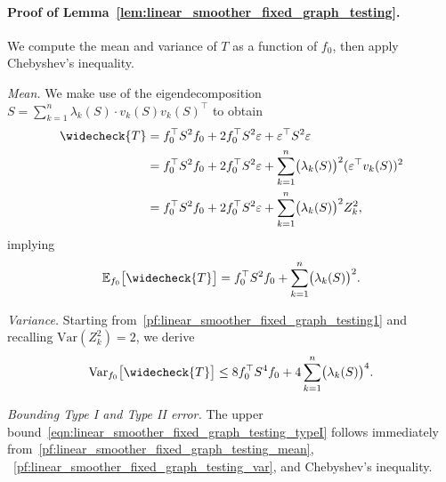 \documentclass[twoside]{article}
\newcommand{\Var}{\mathrm{Var}}
\newcommand{\1}{\mathbf{1}}
\newcommand{\Ebb}{\mathbb{E}}
\newcommand{\wc}[1]{\widecheck{#1}}
\theoremstyle{definition}
\theoremstyle{remark}
\begin{document}
\paragraph{Proof of Lemma~\ref{lem:linear_smoother_fixed_graph_testing}.}
We compute the mean and variance of $T$ as a function of $f_0$, then apply Chebyshev's inequality.

\textit{Mean.} We make use of the eigendecomposition $S = \sum_{k = 1}^{n} \lambda_k(S) \cdot v_k(S) v_k(S)^{\top}$ to obtain
\begin{equation}
\label{pf:linear_smoother_fixed_graph_testing1}
\begin{aligned}
\wc{T} & = f_0^{\top} S^2 f_0 + 2 f_0^{\top} S^2 \varepsilon + \varepsilon^{\top} S^2 \varepsilon \\
& = f_0^{\top} S^2 f_0 + 2 f_0^{\top} S^2 \varepsilon + \sum_{k = 1}^{n}  \bigl(\lambda_k(S)\bigr)^2 (\varepsilon^{\top} v_k(S))^2 \\
& = f_0^{\top} S^2 f_0 + 2 f_0^{\top} S^2 \varepsilon + \sum_{k = 1}^{n}  \bigl(\lambda_k(S)\bigr)^2 Z_k^2,
\end{aligned}
\end{equation}
implying
\begin{equation}
\label{pf:linear_smoother_fixed_graph_testing_mean}
\Ebb_{f_0}\bigl[\wc{T}\bigr] = f_0^{\top} S^2 f_0 + \sum_{k = 1}^{n} \bigl(\lambda_k(S)\bigr)^2.
\end{equation}

\textit{Variance.} Starting from~\eqref{pf:linear_smoother_fixed_graph_testing1} and recalling $\Var(Z_k^2) = 2$, we derive
\begin{equation}
\label{pf:linear_smoother_fixed_graph_testing_var}
\Var_{f_0}\bigl[\wc{T}\bigr] \leq 8 f_0^{\top} S^4 f_0 + 4 \sum_{k = 1}^{n} \bigl(\lambda_k(S)\bigr)^4.
\end{equation}

\textit{Bounding Type I and Type II error.} The upper bound~\eqref{eqn:linear_smoother_fixed_graph_testing_typeI} follows immediately from~\eqref{pf:linear_smoother_fixed_graph_testing_mean}, ~\eqref{pf:linear_smoother_fixed_graph_testing_var}, and Chebyshev's inequality.
\end{document}
